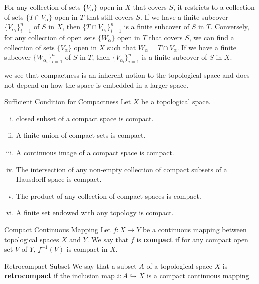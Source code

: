 \documentclass{report}
\begin{document}
\begin{prf}
	For any collection of sets $\{V_\alpha\}$ open in $X$ that covers $S$, it restricts to a collection of sets $\{T\cap V_\alpha\}$ open in $T$ that still covers $S$. If we have a finite subcover $\{V_{\alpha_i}\}_{i=1}^n$ of $S$ in $X$, then $\{T\cap V_{\alpha_i}\}_{i=1}^n$ is a finite subcover of $S$ in $T$. Conversely, for any collection of open sets $\{W_\alpha\}$ open in $T$ that covers $S$, we can find a collection of sets $\{V_\alpha\}$ open in $X$ such that $W_\alpha=T\cap V_\alpha$. If we have a finite subcover $\{W_{\alpha_i}\}_{i=1}^n$ of $S$ in $T$, then $\{V_{\alpha_i}\}_{i=1}^n$ is a finite subcover of $S$ in $X$.
\end{prf}

we see that compactness is an inherent notion to the topological space and does not depend on how the space is embedded in a larger space.

\begin{proposition}{Sufficient Condition for Compactness}{}
	Let $X$ be a topological space.
	\begin{enumerate}[(i)]
		\item closed subset of a compact space is compact.
		\item A finite union of compact sets is compact.
		\item A continuous image of a compact space is compact.
		\item The intersection of any non-empty collection of compact subsets of a Hausdorff space is compact.
		\item The product of any collection of compact spaces is compact.
		\item A finite set endowed with any topology is compact.
	\end{enumerate}
\end{proposition}


\begin{definition}{Compact Continuous Mapping}{}
	Let $f:X\to Y$ be a continuous mapping between topological spaces $X$ and $Y$. We say that $f$ is \textbf{compact} if for any compact open set $V$ of $Y$, $f^{-1}(V)$ is compact in $X$.
\end{definition}

\begin{definition}{Retrocompact Subset}{}
	We say that a subset $A$ of a topological space $X$ is \textbf{retrocompact} if the inclusion map $i:A\hookrightarrow X$ is a compact continuous mapping.
\end{definition}
\end{document}
